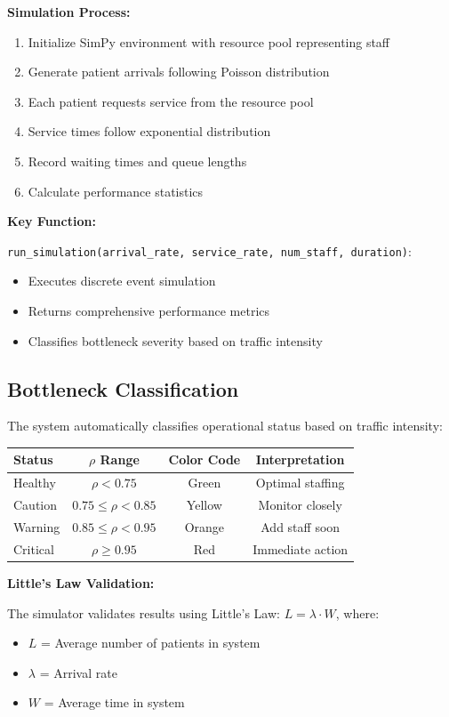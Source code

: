 \documentclass[12pt,a4paper]{article}
\begin{document}
\textbf{Simulation Process:}
\begin{enumerate}
    \item Initialize SimPy environment with resource pool representing staff
    \item Generate patient arrivals following Poisson distribution
    \item Each patient requests service from the resource pool
    \item Service times follow exponential distribution
    \item Record waiting times and queue lengths
    \item Calculate performance statistics
\end{enumerate}

\textbf{Key Function:}

\texttt{run\_simulation(arrival\_rate, service\_rate, num\_staff, duration)}:
\begin{itemize}
    \item Executes discrete event simulation
    \item Returns comprehensive performance metrics
    \item Classifies bottleneck severity based on traffic intensity
\end{itemize}

\subsection{Bottleneck Classification}

The system automatically classifies operational status based on traffic intensity:

\begin{center}
\begin{tabular}{lccc}
\toprule
Status & $\rho$ Range & Color Code & Interpretation \\
\midrule
Healthy & $\rho < 0.75$ & Green & Optimal staffing \\
Caution & $0.75 \leq \rho < 0.85$ & Yellow & Monitor closely \\
Warning & $0.85 \leq \rho < 0.95$ & Orange & Add staff soon \\
Critical & $\rho \geq 0.95$ & Red & Immediate action \\
\bottomrule
\end{tabular}
\end{center}

\textbf{Little's Law Validation:}

The simulator validates results using Little's Law: $L = \lambda \cdot W$, where:
\begin{itemize}
    \item $L$ = Average number of patients in system
    \item $\lambda$ = Arrival rate
    \item $W$ = Average time in system
\end{itemize}
\end{document}
